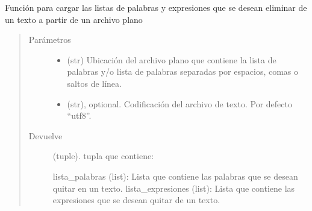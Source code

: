 \documentclass[letterpaper,10pt,openany,spanish]{sphinxmanual}
\begin{document}
\begin{fulllineitems}
\label{\detokenize{funciones/limpieza:limpieza.cargar_stopwords}}
Función para cargar las listas de palabras y expresiones que se desean     eliminar de un texto a partir de un archivo plano
\begin{quote}\begin{description}
\item[{Parámetros}] \leavevmode\begin{itemize}
\item {} 
 \textendash{} (str) Ubicación del archivo plano que contiene la lista de palabras         y/o lista de palabras separadas por espacios, comas o saltos de línea.

\item {} 
 \textendash{} (str), optional. Codificación del archivo de texto. Por defecto “utf\sphinxhyphen{}8”.

\end{itemize}

\item[{Devuelve}] \leavevmode

(tuple). tupla que contiene: 

   lista\_palabras (list): Lista que contiene las palabras que se desean quitar en un texto. 
 lista\_expresiones (list): Lista que contiene las expresiones que se desean quitar de un texto.   


\end{description}\end{quote}

\end{fulllineitems}

\end{document}
